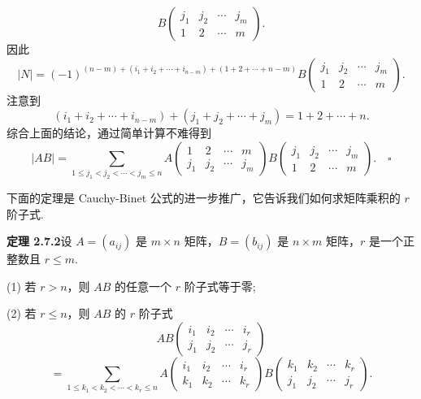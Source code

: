 \documentclass[UTF8,12pt,a4paper,fontset=fandol]{ctexart}
\begin{document}
\[
B\left(\begin{array}{cccc}
j_1 & j_2 & \cdots & j_m\\
1 & 2 & \cdots & m
\end{array}\right).
\]
因此
\[
|N|=(-1)^{(n-m)+(i_1+i_2+\cdots+i_{n-m})+(1+2+\cdots+n-m)}
B\left(\begin{array}{cccc}
j_1 & j_2 & \cdots & j_m\\
1 & 2 & \cdots & m
\end{array}\right).
\]
注意到
\[
(i_1+i_2+\cdots+i_{n-m})+(j_1+j_2+\cdots+j_m)=1+2+\cdots+n.
\]
综合上面的结论，通过简单计算不难得到
\[
|AB|=\sum_{1\leq j_1<j_2<\cdots<j_m\leq n}
A\left(\begin{array}{cccc}
1 & 2 & \cdots & m\\
j_1 & j_2 & \cdots & j_m
\end{array}\right)
B\left(\begin{array}{cccc}
j_1 & j_2 & \cdots & j_m\\
1 & 2 & \cdots & m
\end{array}\right). \quad \square
\]

下面的定理是 Cauchy-Binet 公式的进一步推广，它告诉我们如何求矩阵乘积的 $r$ 阶子式.

\noindent\textbf{定理 2.7.2}\quad 设 $A=(a_{ij})$ 是 $m\times n$ 矩阵，$B=(b_{ij})$ 是 $n\times m$ 矩阵，$r$ 是一个正整数且 $r\leq m$.

(1) 若 $r>n$，则 $AB$ 的任意一个 $r$ 阶子式等于零;

(2) 若 $r\leq n$，则 $AB$ 的 $r$ 阶子式
\[
AB\left(\begin{array}{cccc}
i_1 & i_2 & \cdots & i_r\\
j_1 & j_2 & \cdots & j_r
\end{array}\right)
\]
\[
=\sum_{1\leq k_1<k_2<\cdots<k_r\leq n}
A\left(\begin{array}{cccc}
i_1 & i_2 & \cdots & i_r\\
k_1 & k_2 & \cdots & k_r
\end{array}\right)
B\left(\begin{array}{cccc}
k_1 & k_2 & \cdots & k_r\\
j_1 & j_2 & \cdots & j_r
\end{array}\right).
\]
\end{document}
